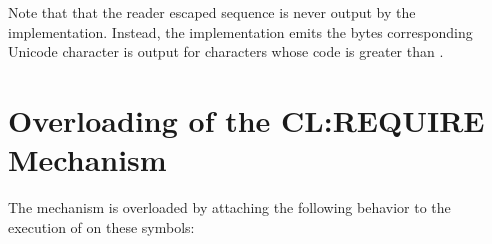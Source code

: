 \documentclass[10pt]{book}
\begin{document}


Note that that the reader escaped sequence is never output by the
implementation.  Instead, the implementation emits the bytes
corresponding Unicode character is output for characters whose code is
greater than .

\section{Overloading of the CL:REQUIRE Mechanism}

The  mechanism is overloaded by attaching the
following behavior to the execution of  on these symbols:
\end{document}
